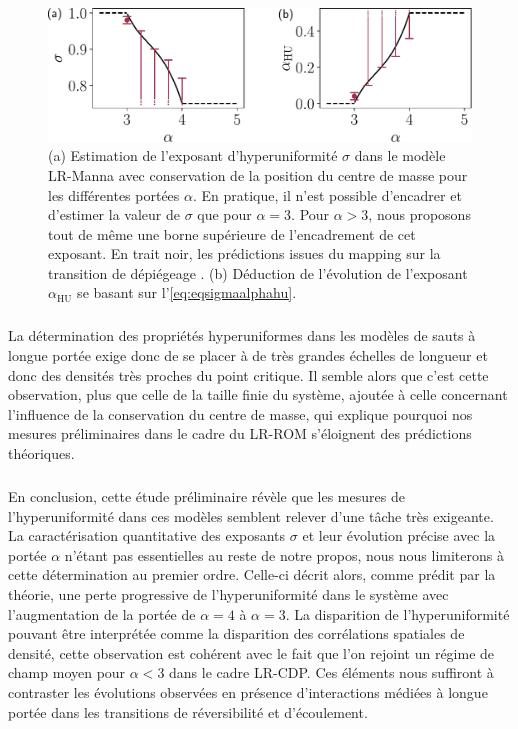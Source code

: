 \begin{figure}[h]
\centering
\includegraphics[width=\textwidth]{Chapitre2/Figures/Hyperuniformity/eta_alpha_jumpsManna.pdf}
\caption{(a) Estimation de l'exposant d'hyperuniformité $\sigma$ dans le modèle LR-Manna avec conservation de la position du centre de masse pour les différentes portées $\alpha$. En pratique, il n'est possible d'encadrer et d'estimer la valeur de $\sigma$ que pour $\alpha=3$. Pour $\alpha>3$, nous proposons tout de même une borne supérieure de l'encadrement de cet exposant. En trait noir, les prédictions issues du mapping sur la transition de dépiégeage \cite{wiese_longrange}. (b) Déduction de l'évolution de l'exposant $\alpha_\text{HU}$ se basant sur l'\autoref{eq:eqsigmaalphahu}. }
\label{eq:HUMannaShlag}
\end{figure}

\subparagraph{}La détermination des propriétés hyperuniformes dans les modèles de sauts à longue portée exige donc de se placer à de très grandes échelles de longueur et donc des densités très proches du point critique. Il semble alors que c'est cette observation, plus que celle de la taille finie du système, ajoutée à celle concernant l'influence de la conservation du centre de masse, qui explique pourquoi nos mesures préliminaires dans le cadre du LR-ROM s'éloignent des prédictions théoriques. 

\subparagraph{}En conclusion, cette étude préliminaire révèle que les mesures de l'hyperuniformité dans ces modèles semblent relever d'une tâche très exigeante. La caractérisation quantitative des exposants $\sigma$ et leur évolution précise avec la portée $\alpha$ n'étant pas essentielles au reste de notre propos, nous nous limiterons à cette détermination au premier ordre. Celle-ci décrit alors, comme prédit par la théorie, une perte progressive de l'hyperuniformité dans le système avec l'augmentation de la portée de $\alpha=4$ à $\alpha=3$. La disparition de l'hyperuniformité pouvant être interprétée comme la disparition des corrélations spatiales de densité, cette observation est cohérent avec le fait que l'on rejoint un régime de champ moyen pour $\alpha <3$ dans le cadre LR-CDP. Ces éléments nous suffiront à contraster les évolutions observées en présence d'interactions médiées à longue portée dans les transitions de réversibilité et d'écoulement.

